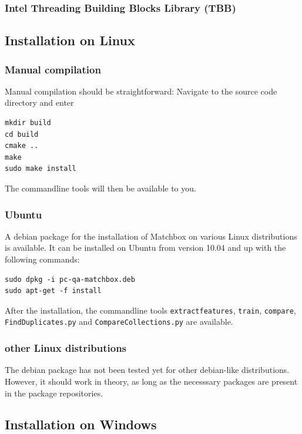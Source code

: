 \subsubsection{Intel Threading Building Blocks Library (TBB)}

\subsection{Installation on Linux}

\subsubsection{Manual compilation}
Manual compilation should be straightforward:
Navigate to the source code directory and enter

\begin{verbatim}
mkdir build
cd build
cmake ..
make
sudo make install
\end{verbatim}

The commandline tools will then be available to you.

\subsubsection{Ubuntu}
A debian package for the installation of Matchbox on various Linux distributions is available.
It can be installed on Ubuntu from version 10.04 and up with the following commands:

\begin{verbatim}
sudo dpkg -i pc-qa-matchbox.deb
sudo apt-get -f install
\end{verbatim}

After the installation, the commandline tools \verb+extractfeatures+, \verb+train+,
\verb+compare+, \verb+FindDuplicates.py+ and \verb+CompareCollections.py+ are 
available.

\subsubsection{other Linux distributions}
The debian package has not been tested yet for other debian-like distributions.
However, it should work in theory, as long as the necesssary packages are present
in the package repositories.

\subsection{Installation on Windows}

